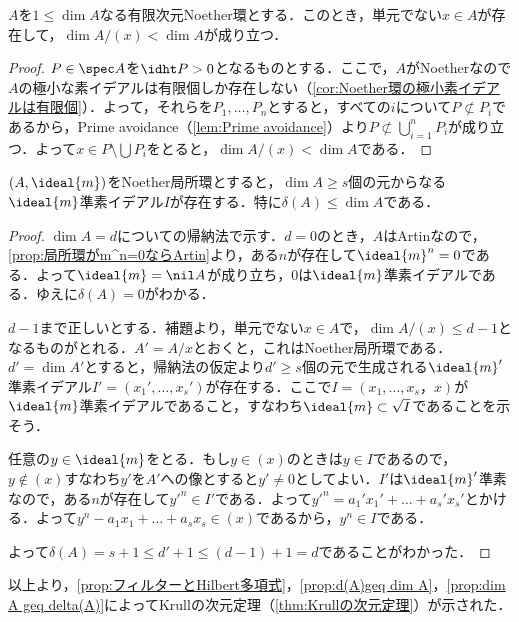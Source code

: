 \begin{lem}
	$A$を$1\leq\dim A$なる有限次元Noether環とする．このとき，単元でない$x\in A$が存在して，$\dim A/(x)<\dim A$が成り立つ．
\end{lem}

\begin{proof}
	$P\in\spec A$を$\idht P>0$となるものとする．ここで，$A$がNoetherなので$A$の極小な素イデアルは有限個しか存在しない（\ref{cor:Noether環の極小素イデアルは有限個}）．よって，それらを$P_1,\dots, P_n$とすると，すべての$i$について$P\not\subset P_i$であるから，Prime avoidance（\ref{lem:Prime avoidance}）より$P\not\subset\bigcup_{i=1}^nP_i$が成り立つ．よって$x\in P\setminus\bigcup P_i$をとると，$\dim A/(x)<\dim A$である．

\end{proof}
\begin{prop}\label{prop:dim A geq delta(A)}
	$(A,\ideal{m})$をNoether局所環とすると，$\dim A\geq s$個の元からなる$\ideal{m}$準素イデアル$I$が存在する．特に$\delta(A)\leq\dim A$である．
\end{prop}

\begin{proof}
	$\dim A=d$についての帰納法で示す．$d=0$のとき，$A$はArtinなので，\ref{prop:局所環がm^n=0ならArtin}より，ある$n$が存在して$\ideal{m}^n=0$である．よって$\ideal{m}=\nil A$が成り立ち，$0$は$\ideal{m}$準素イデアルである．ゆえに$\delta(A)=0$がわかる．
		
	$d-1$まで正しいとする．補題より，単元でない$x\in A$で，$\dim A/(x)\leq d-1$となるものがとれる．$A'=A/x$とおくと，これはNoether局所環である．$d'=\dim A'$とすると，帰納法の仮定より$d'\geq s$個の元で生成される$\ideal{m}'$準素イデアル$I'=(x_1',\dots,x_s')$が存在する．ここで$I=(x_1,\dots,x_s，x)$が$\ideal{m}$準素イデアルであること，すなわち$\ideal{m}\subset\sqrt{I}$であることを示そう．
		
	任意の$y\in\ideal{m}$をとる．もし$y\in (x)$のときは$y\in I$であるので，$y\not\in(x)$すなわち$y'$を$A'$への像とすると$y'\neq0$としてよい．$I'$は$\ideal{m}'$準素なので，ある$n$が存在して$y'^n\in I'$である．よって$y'^n=a_1'x_1'+\dots+a_s'x_s'$とかける．よって$y^n-a_1x_1+\dots+a_sx_s\in (x)$であるから，$y^n\in I$である．
		
	よって$\delta(A)=s+1\leq d'+1\leq (d-1)+1=d$であることがわかった．
\end{proof}

以上より，\ref{prop:フィルターとHilbert多項式}，\ref{prop:d(A)geq dim A}，\ref{prop:dim A geq delta(A)}によってKrullの次元定理（\ref{thm:Krullの次元定理}）が示された．

